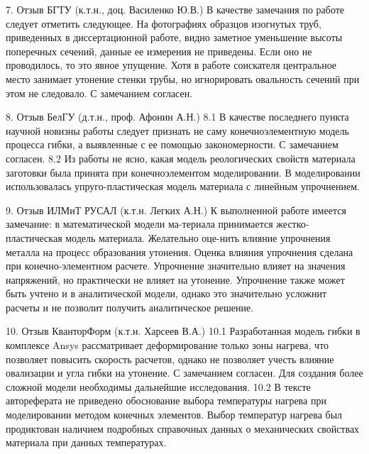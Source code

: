 7. Отзыв БГТУ (к.т.н., доц. Василенко Ю.В.)
В качестве замечания по работе следует отметить следующее. На фотографиях образцов изогнутых труб, приведенных в диссертационной работе, видно заметное уменьшение высоты поперечных сечений, данные ее измерения не приведены. Если оно не проводилось, то это явное упущение. Хотя в работе соискателя центральное место занимает утонение стенки трубы, но игнорировать овальность сечений при этом не следовало.
С замечанием согласен.

8. Отзыв БелГУ (д.т.н., проф. Афонин А.Н.)
8.1 В качестве последнего пункта научной новизны работы следует признать не саму конечноэлементную модель процесса гибки, а выявленные с ее помощью закономерности.
С замечанием согласен.
8.2 Из работы не ясно, какая модель реологических свойств материала заготовки была принята при конечноэлементом моделировании.
В моделировании использовалась упруго-пластическая модель материала с линейным упрочнением.

9. Отзыв ИЛМиТ РУСАЛ (к.т.н. Легких А.Н.)
К выполненной работе имеется замечание: в математической модели ма-териала принимается жестко-пластическая модель материала. Желательно оце-нить влияние упрочнения металла на процесс образования утонения.
Оценка влияния упрочнения сделана при конечно-элементном расчете. Упрочнение значительно влияет на значения напряжений, но практически не влияет на утонение. Упрочнение также может быть учтено и в аналитической модели, однако это значительно усложнит расчеты и не позволит получить аналитическое решение.

10. Отзыв КванторФорм (к.т.н. Харсеев В.А.)
10.1	Разработанная модель гибки в комплексе Ansys рассматривает деформирование только зоны нагрева, что позволяет повысить скорость расчетов, однако не позволяет учесть влияние овализации и угла гибки на утонение.
С замечанием согласен. Для создания более сложной модели необходимы дальнейшие исследования.
10.2	В тексте автореферата не приведено обоснование выбора температуры нагрева при моделировании методом конечных элементов.
Выбор температур нагрева был продиктован наличием подробных справочных данных о механических свойствах материала при данных температурах.

\clearpage